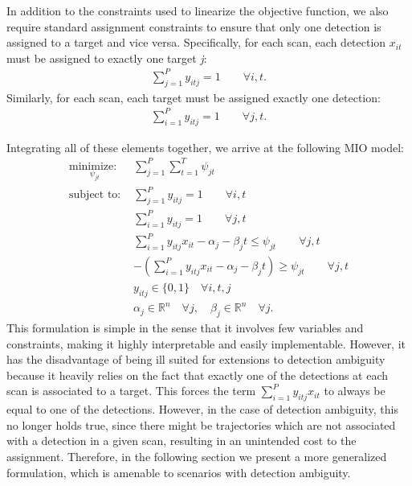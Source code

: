 In addition to the constraints used to linearize the objective function, we also require standard assignment constraints to ensure that only one detection is assigned to a target and vice versa. Specifically, for each scan, each detection $x_{it}$ must be assigned to exactly one target \textit{j}:
\begin{align}\label{eq:all_detections}
\sum_{j=1}^{P} y_{itj} = 1 \qquad \forall i,t.
\end{align}
Similarly, for each scan, each target must be assigned exactly one detection:
\begin{align}\label{eq:all_targets}
\sum_{i=1}^{P} y_{itj} = 1 \qquad \forall j,t.
\end{align}

Integrating all of these elements together, we arrive at the following MIO model:
\begin{align}
\underset{\psi_{jt}}{\text{minimize: }} & \sum_{j=1}^{P} \sum_{t=1}^{T} \psi_{jt} \label{eq:simple_problem} \\
\text{subject to: }	& \sum_{j=1}^{P} y_{itj} = 1 \qquad \forall i,t\nonumber \\
				& \sum_{i=1}^{P} y_{itj} = 1 \qquad \forall j,t\nonumber \\
				& \sum_{i=1}^{P}y_{itj}x_{it} - \alpha_{j} - \beta_{j}t \leq \psi_{jt} \qquad \forall j,t \nonumber \\
				& -\left(\sum_{i=1}^{P}y_{itj}x_{it} - \alpha_{j} - \beta_{j}t\right) \geq \psi_{jt} \qquad \forall j,t \nonumber \\
			 	& y_{itj} \in \{0,1\} \quad \forall i,t,j \nonumber\\
				& \alpha_{j} \in \mathbb{R}^n \quad \forall j,\quad \beta_{j} \in \mathbb{R}^n \quad \forall j. \nonumber
\end{align}
This formulation is simple in the sense that it involves few variables and constraints, making it highly interpretable and easily implementable. However, it has the disadvantage of being ill suited for extensions to detection ambiguity because it heavily relies on the fact that exactly one of the detections at each scan is associated to a target. This forces the term $\sum_{i=1}^{P}y_{itj}x_{it}$ to always be equal to one of the detections. However, in the case of detection ambiguity, this no longer holds true, since there might be trajectories which are not associated with a detection in a given scan, resulting in an unintended cost to the assignment. Therefore, in the following section we present a more generalized formulation, which is amenable to scenarios with detection ambiguity.

